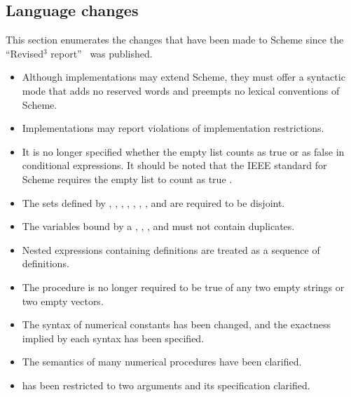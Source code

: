 


\subsection*{Language changes}
\label{differences}

This section enumerates the changes that have been made to Scheme since
the ``Revised$^3$ report''~\cite{R3RS} was published.


\begin{itemize}
\item Although implementations may extend Scheme, they must offer
a syntactic mode that adds no reserved words and preempts no lexical conventions
of Scheme.

\item Implementations may report violations of
implementation restrictions.

\item It is no longer specified whether the empty list counts as true
or as false in conditional expressions.  It should be noted that the
IEEE standard for Scheme requires the empty list to count as true
\cite{IEEEScheme}.

\item The sets defined by , , ,
, , , , and 
are required to be disjoint.

\item The variables bound by a , , ,
and  must not contain duplicates.

\item Nested  expressions containing definitions are treated
as a sequence of definitions.

\item The  procedure is no longer required to be true of any
two empty strings or two empty vectors.

\item The syntax of numerical constants has been changed, and the exactness
implied by each syntax has been specified.

\item The semantics of many numerical procedures have been clarified.

\item {} has been restricted to two arguments and its
specification clarified.


\end{itemize}
